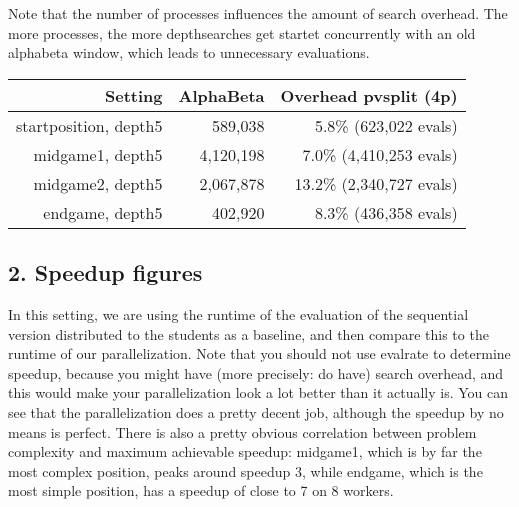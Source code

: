 Note that the number of processes influences the amount of search overhead. The more processes, the more depthsearches get startet concurrently with an old alphabeta window, which leads to unnecessary evaluations.

\begin{center}
  \begin{tabular}{|r|r|r|}
    \hline
    Setting & AlphaBeta & Overhead pvsplit (4p)\\ \hline
    startposition, depth5 & 589,038 & 5.8\% (623,022 evals)  \\ \hline
    midgame1, depth5 & 4,120,198 & 7.0\% (4,410,253 evals)  \\ \hline
    midgame2, depth5 & 2,067,878 & 13.2\% (2,340,727 evals)   \\ \hline
    endgame, depth5 & 402,920 & 8.3\% (436,358 evals)   \\ \hline
  \end{tabular}
\end{center}


\subsection*{2. Speedup figures}
In this setting, we are using the runtime of the evaluation of the sequential version distributed to the students as a baseline, and then compare this to the runtime of our parallelization. Note that you should not use evalrate to determine speedup, because you might have (more precisely: do have) search overhead, and this would make your parallelization look a lot better than it actually is.
You can see that the parallelization does a pretty decent job, although the speedup by no means is perfect.  There is also a pretty obvious correlation between problem complexity and maximum achievable speedup: midgame1, which is by far the most complex position, peaks around speedup 3, while endgame, which is the most simple position, has a speedup of close to 7 on 8 workers.

